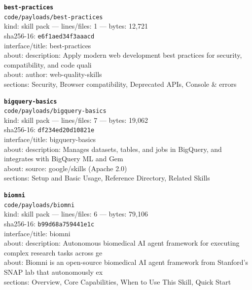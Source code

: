 \noindent\textbf{\texttt{best-practices}}\\
\texttt{code/payloads/best-practices}\\
kind: skill pack --- lines/files: 1 --- bytes: 12,721\\
sha256-16: \texttt{e6f1aed34f3aaacd}\\
interface/title: best-practices\\
about: description: Apply modern web development best practices for security, compatibility, and code quali\\
about: author: web-quality-skills\\
sections: Security, Browser compatibility, Deprecated APIs, Console \& errors\\
\vspace*{6.0pt}

\noindent\textbf{\texttt{bigquery-basics}}\\
\texttt{code/payloads/bigquery-basics}\\
kind: skill pack --- lines/files: 7 --- bytes: 19,062\\
sha256-16: \texttt{df234ed20d10821e}\\
interface/title: bigquery-basics\\
about: description: Manages datasets, tables, and jobs in BigQuery, and integrates with BigQuery ML and Gem\\
about: source: google/skills (Apache 2.0)\\
sections: Setup and Basic Usage, Reference Directory, Related Skills\\
\vspace*{6.0pt}

\noindent\textbf{\texttt{biomni}}\\
\texttt{code/payloads/biomni}\\
kind: skill pack --- lines/files: 6 --- bytes: 79,106\\
sha256-16: \texttt{b99d68a759441e1c}\\
interface/title: biomni\\
about: description: Autonomous biomedical AI agent framework for executing complex research tasks across ge\\
about: Biomni is an open-source biomedical AI agent framework from Stanford's SNAP lab that autonomously ex\\
sections: Overview, Core Capabilities, When to Use This Skill, Quick Start\\
\vspace*{6.0pt}
\newpage

